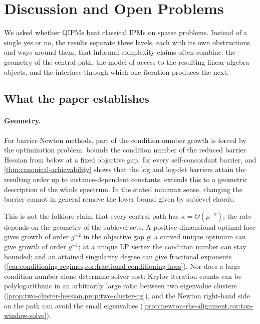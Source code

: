 \section{Discussion and Open Problems}
\label{sec:discussion}

We asked whether QIPMs beat classical IPMs on sparse problems.  Instead of a
single yes or no, the results separate three levels, each with its own
obstructions and ways around them, that informal complexity claims often
combine: the geometry of the central path, the model of access to the
resulting linear-algebra objects, and the interface through which one
iteration produces the next.

\subsection{What the paper establishes}
\label{sec:discussion-verdict}

\paragraph{Geometry.}
For barrier-Newton methods, part of the condition-number growth is forced
by the optimization problem.   bounds the
condition number of the reduced barrier Hessian from below at a fixed
objective gap, for every self-concordant barrier, and
\cref{thm:canonical-achievability} shows that the log and log-det barriers
attain the resulting order up to instance-dependent constants.
 extends this to a geometric description
of the whole spectrum.  In the stated minimax sense, changing the barrier
cannot in general remove the lower bound given by sublevel chords.

This is not the folklore claim that every central path has
\(\kappa=\Theta(\mu^{-2})\); the rate depends on the geometry of the
sublevel sets.  A positive-dimensional optimal face gives growth of order
\(g^{-2}\) in the objective gap \(g\); a curved unique optimum can give
growth of order \(g^{-1}\); at a unique LP vertex the condition number can
stay bounded; and an attained singularity degree can give fractional
exponents (\cref{cor:conditioning-regimes,cor:fractional-conditioning-laws}).
Nor does a large condition number alone determine solver cost: Krylov
iteration counts can be polylogarithmic in an arbitrarily large ratio
between two eigenvalue clusters
(\cref{prop:two-cluster-hessian,prop:two-cluster-cg}), and the Newton
right-hand side on the path can avoid the small eigenvalues
(\cref{prop:newton-rhs-alignment,cor:top-window-solve}).

